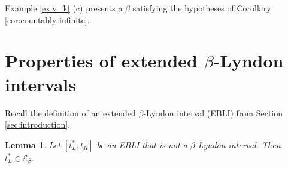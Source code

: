 \documentclass[11pt]{amsart}
\newtheorem{lemma}[theorem]{Lemma}
\theoremstyle{definition}
\theoremstyle{remark}
\numberwithin{equation}{section}
\newcommand{\EE}{\mathscr{E}}
\begin{document}
Example \ref{ex:v_k} (c) presents a $\beta$ satisfying the hypotheses of Corollary \ref{cor:countably-infinite}.



\section{Properties of extended $\beta$-Lyndon intervals} \label{sec:EBLI}

Recall the definition of an extended $\beta$-Lyndon interval (EBLI) from Section \ref{sec:introduction}.

\begin{lemma} \label{lem:EBLI-left-endpoint}
Let $[t_L^*,t_R]$ be an EBLI that is not a $\beta$-Lyndon interval. Then $t_L^*\in \EE_\beta$.
\end{lemma}
\end{document}
